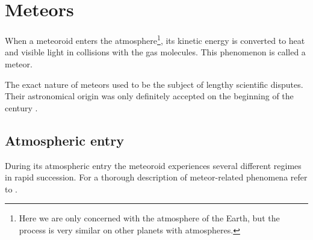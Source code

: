 
\section{Meteors} \label{il}
    When a meteoroid enters the atmosphere\footnote{Here we are only concerned with the atmosphere of the Earth,
    but the process is very similar on other planets with atmospheres.}, its kinetic energy
    is converted to heat and visible light in collisions with the gas molecules.
    This phenomenon is called a meteor. %


    The exact nature of meteors used to be the subject of lengthy scientific disputes.
    Their astronomical origin was only definitely accepted on the beginning of the  century \citep{czegka2000}.


    \subsection{Atmospheric entry} \label{ile}
        During its atmospheric entry the meteoroid experiences several different regimes in rapid succession.
        For a thorough description of meteor-related phenomena refer to \citep{ceplecha+1998}.

